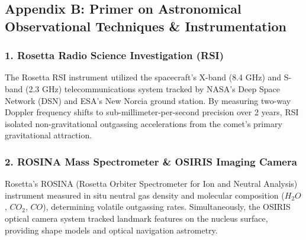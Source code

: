 \documentclass[11pt,a4paper]{article}
\begin{document}
\subsection*{Appendix B: Primer on Astronomical Observational Techniques \& Instrumentation}

\subsubsection*{1. Rosetta Radio Science Investigation (RSI)}
The Rosetta RSI instrument utilized the spacecraft's X-band (8.4 GHz) and S-band (2.3 GHz) telecommunications system tracked by NASA's Deep Space Network (DSN) and ESA's New Norcia ground station. By measuring two-way Doppler frequency shifts to sub-millimeter-per-second precision over 2 years, RSI isolated non-gravitational outgassing accelerations from the comet's primary gravitational attraction.

\subsubsection*{2. ROSINA Mass Spectrometer \& OSIRIS Imaging Camera}
Rosetta's ROSINA (Rosetta Orbiter Spectrometer for Ion and Neutral Analysis) instrument measured in situ neutral gas density and molecular composition ($H_2O$, $CO_2$, $CO$), determining volatile outgassing rates. Simultaneously, the OSIRIS optical camera system tracked landmark features on the nucleus surface, providing shape models and optical navigation astrometry.
\end{document}
